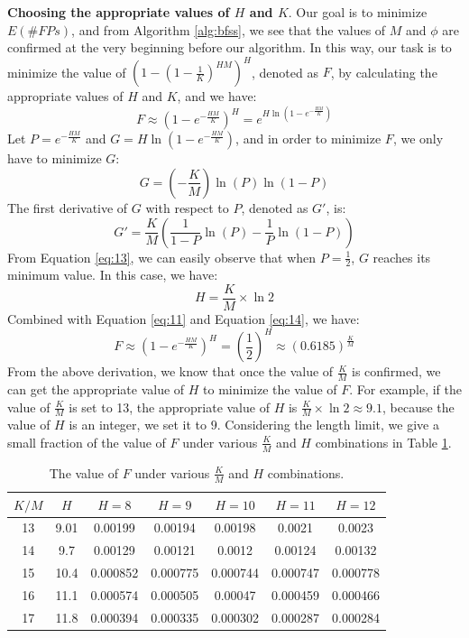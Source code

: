 \documentclass[conference]{IEEEtran}
\begin{document}
\textbf{Choosing the appropriate values of $H$ and $K$}. Our goal is to minimize $E(\#FPs)$, and from Algorithm \ref{alg:bfss}, we see that the values of $M$ and $\phi$ are confirmed at the very beginning before our algorithm. In this way, our task is to minimize the value of $(1-(1-\frac{1}{K})^{HM})^H$, denoted as $F$, by calculating the appropriate values of $H$ and $K$, and we have:
\begin{equation}\label{eq:11}
F\approx(1-e^{-\frac{HM}{K}})^H=e^{H\ln (1-e^{-\frac{HM}{K}})}
\end{equation}
Let $P=e^{-\frac{HM}{K}}$ and $G=H\ln (1-e^{-\frac{HM}{K}})$, and in order to minimize $F$, we only have to minimize $G$:
\begin{equation}\label{eq:12}
G=(-\frac{K}{M})\ln(P)\ln(1-P)
\end{equation}
The first derivative of $G$ with respect to $P$, denoted as $G'$, is:
\begin{equation}\label{eq:13}
G'=\frac{K}{M}(\frac{1}{1-P}\ln(P)-\frac{1}{P}\ln(1-P))
\end{equation}
From Equation \ref{eq:13}, we can easily observe that when $P=\frac{1}{2}$, $G$ reaches its minimum value. In this case, we have:
\begin{equation}\label{eq:14}
H=\frac{K}{M}\times\ln 2
\end{equation}
Combined with Equation \ref{eq:11} and Equation \ref{eq:14}, we have:
\begin{equation}\label{eq:15}
F\approx(1-e^{-\frac{HM}{K}})^H=(\frac{1}{2})^H\approx(0.6185)^{\frac{K}{M}}
\end{equation}
From the above derivation, we know that once the value of $\frac{K}{M}$ is confirmed, we can get the appropriate value of $H$ to minimize the value of $F$. For example, if the value of $\frac{K}{M}$ is set to 13, the appropriate value of $H$ is $\frac{K}{M}\times\ln 2\approx9.1$, because the value of $H$ is an integer, we set it to $9$. Considering the length limit, we give a small fraction of the value of $F$ under various $\frac{K}{M}$ and $H$ combinations in Table \ref{tab:2}.\par
\begin{table} 
	\centering
	\caption{The value of $F$ under various $\frac{K}{M}$ and $H$ combinations.}
   \begin{tabular}{|c|c|c|c|c|c|c|}
   	\hline
   	$K/M$ & $H$& $H=8$ & $H=9$ & $H=10$ & $H=11$ & $H=12$\\ 
   	\hline
   	13&9.01&0.00199&0.00194&0.00198&0.0021&0.0023\\
   	\hline
   	14&9.7&0.00129&0.00121&0.0012&0.00124&0.00132\\
   	\hline
   	15&10.4&0.000852&0.000775&0.000744&0.000747&0.000778\\
   	\hline
   	16&11.1&0.000574&0.000505&0.00047&0.000459&0.000466\\
   	\hline
   	17&11.8&0.000394&0.000335&0.000302&0.000287&0.000284\\
   	\hline
   \end{tabular}
    	\label{tab:2}
\end{table}
\end{document}
